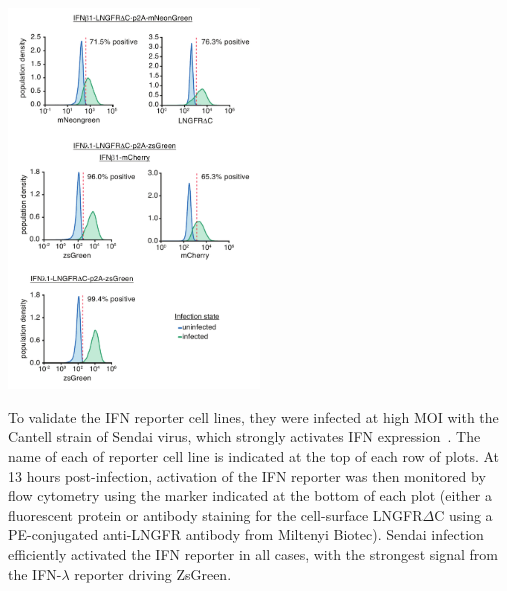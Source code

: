 \documentclass[9pt,lineno]{template}
\begin{document}
\begin{suppfig}
\includegraphics[width=0.5\textwidth]{figures/IFN_stochastic/IFN_reporter/Sendai_validation.pdf}
\caption{To validate the IFN reporter cell lines, they were infected at high MOI with the Cantell strain of Sendai virus, which strongly activates IFN expression~\citep{strahle2006sendai}.
The name of each of reporter cell line is indicated at the top of each row of plots.
At 13 hours post-infection, activation of the IFN reporter was then monitored by flow cytometry using the marker indicated at the bottom of each plot (either a fluorescent protein or antibody staining for the cell-surface LNGFR$\Delta$C using a PE-conjugated anti-LNGFR antibody from Miltenyi Biotec).
Sendai infection efficiently activated the IFN reporter in all cases, with the strongest signal from the IFN-$\lambda$ reporter driving ZsGreen.
}
\label{suppfig:reporter_validation}
\end{suppfig}

\clearpage
\end{document}
